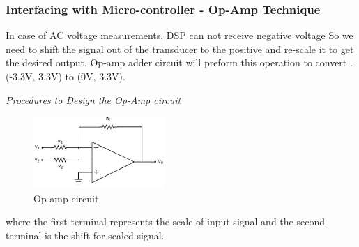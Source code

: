 \documentclass[12pt,a4paper]{book}
\begin{document}
\subsubsection{Interfacing with Micro-controller - Op-Amp Technique}
In case of AC voltage measurements, DSP can not receive negative voltage So we need to shift the signal out of the transducer to the positive and re-scale it to get the desired output. Op-amp adder circuit will preform this operation to convert .(-3.3V, 3.3V) to (0V, 3.3V).

\emph{Procedures to Design the Op-Amp circuit}

\begin{figure}[h!]
  \centering
  \includegraphics[width = 5cm]{image36.png}
  \caption{Op-amp circuit}
  \label{fig:image36}
\end{figure}
where the first terminal represents the scale of input signal and the second terminal is the shift for scaled signal.
\end{document}
